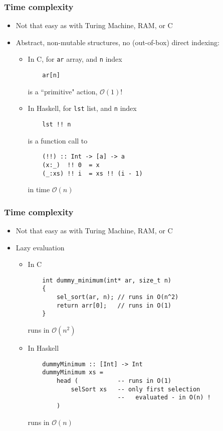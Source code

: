 \documentclass[final,handout]{beamer}
\begin{document}
\begin{frame}[fragile]
    \frametitle{Time complexity}

    \begin{itemize}
        \item Not that easy as with Turing Machine, RAM, or C
        \item<2-> Abstract, non-mutable structures, no (out-of-box) direct indexing:
            \begin{itemize}
                \item In C, for \texttt{ar} array, and \texttt{n} index \\
                    \begin{verbatim}
    ar[n]
                    \end{verbatim}
                    is a ``primitive" action, $\mathcal{O}(1)$!
                \item<3-> In Haskell, for \texttt{lst} list, and \texttt{n} index\\
                    \begin{verbatim}
    lst !! n
                    \end{verbatim}
                    is a function call to
                    \begin{verbatim}
    (!!) :: Int -> [a] -> a
    (x:_)  !! 0  = x
    (_:xs) !! i  = xs !! (i - 1)
                    \end{verbatim}
                    in time $\mathcal{O}(n)$
            \end{itemize}
    \end{itemize}

\end{frame}

\begin{frame}[fragile]
    \frametitle{Time complexity}

    \begin{itemize}
        \item Not that easy as with Turing Machine, RAM, or C
        \item<2-> Lazy evaluation
            \begin{itemize}
                \item In C
                    \begin{verbatim}
    int dummy_minimum(int* ar, size_t n)
    {
        sel_sort(ar, n); // runs in O(n^2)
        return arr[0];   // runs in O(1)
    }
                    \end{verbatim}
                    runs in $\mathcal{O}(n^2)$
                \item<3-> In Haskell
                    \begin{verbatim}
    dummyMinimum :: [Int] -> Int
    dummyMinimum xs =
        head (           -- runs in O(1)
            selSort xs   -- only first selection 
                         --   evaluated - in O(n) !
        )
                    \end{verbatim}
                    runs in $\mathcal{O}(n)$
            \end{itemize}
    \end{itemize}
\end{frame}
\end{document}
